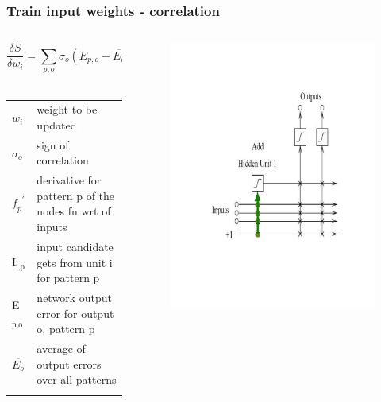 \documentclass[presentation]{beamer}
\begin{document}
\begin{frame}
  \frametitle{Train input weights - correlation}
	\begin{columns}[t]
		\begin{column}{0.5\textwidth}
      $$ \frac{\delta S}{\delta w_{i}} = \sum_{p,o} \sigma_{o}(E_{p,o} - \overline{E_{o}}) \mathit{f_{p}}^{\prime} I_{i,p} $$
     \\ 
      \begin{center}
        \begin{tabular}{ll}
          \(\mathit{w_{i}}\) & \tiny{weight to be updated}  \\
          \(\sigma_{o}\) & \tiny{sign of correlation}  \\
          \(\mathit{f_{p}}^{\prime}\) & \tiny{derivative for pattern p of the nodes fn wrt of inputs} \\
          I\(_{\text{i,p}}\) & \tiny{input candidate gets from unit i for pattern p}  \\
          E\(_{\text{p,o}}\) & \tiny{network output error for output o, pattern p} \\
          \(\overline{E_{o}}\) & \tiny{average of output errors over all patterns} \\
          & \\
        \end{tabular}
      \end{center}
		\end{column}
		\begin{column}{0.5\textwidth}
      \begin{figure}
        \centering
        \includegraphics[scale=0.28]{trainInputunit.png}

\end{figure}
\end{column}
\end{columns}
\end{frame}
\end{document}
